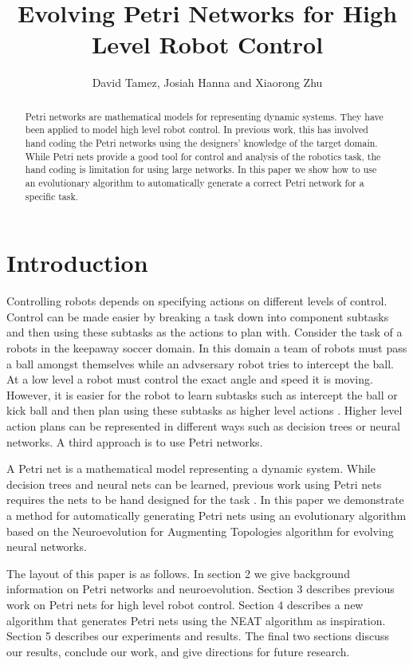 \documentclass[12pt,a4paper,twocolumn]{article}
\author{David Tamez, Josiah Hanna and Xiaorong Zhu}
\title{Evolving Petri Networks for High Level Robot Control}
\begin{document}
\maketitle

\begin{abstract}

Petri networks are mathematical models for representing dynamic systems. They have been applied to model high level robot control. In previous work, this has involved hand coding the Petri networks using the designers' knowledge of the target domain. While Petri nets provide a good tool for control and analysis of the robotics task, the hand coding is limitation for using large networks. In this paper we show how to use an evolutionary algorithm to automatically generate a correct Petri network for a specific task.

\end{abstract}

\section{Introduction}

Controlling robots depends on specifying actions on different levels of control. Control can be made easier by breaking a task down into component subtasks and then using these subtasks as the actions to plan with. Consider the task of a robots in the keepaway soccer domain. In this domain a team of robots must pass a ball amongst themselves while an advsersary robot tries to intercept the ball. At a low level a robot must control the exact angle and speed it is moving. However, it is easier for the robot to learn subtasks such as intercept the ball or kick ball and then plan using these subtasks as higher level actions \cite{whiteson}. Higher level action plans can be represented in different ways such as decision trees or neural networks. A third approach is to use Petri networks. 

A Petri net is a mathematical model representing a dynamic system. While decision trees and neural nets can be learned, previous work using Petri nets requires the nets to be hand designed for the task \cite{ziparo2011petri}. In this paper we demonstrate a method for automatically generating Petri nets using an evolutionary algorithm based on the Neuroevolution for Augmenting Topologies algorithm for evolving neural networks.

The layout of this paper is as follows. In section 2 we give background information on Petri networks and neuroevolution. Section 3 describes previous work on Petri nets for high level robot control. Section 4 describes a new algorithm that generates Petri nets using the NEAT algorithm as inspiration. Section 5 describes our experiments and results. The final two sections discuss our results, conclude our work, and give directions for future research.
\end{document}
